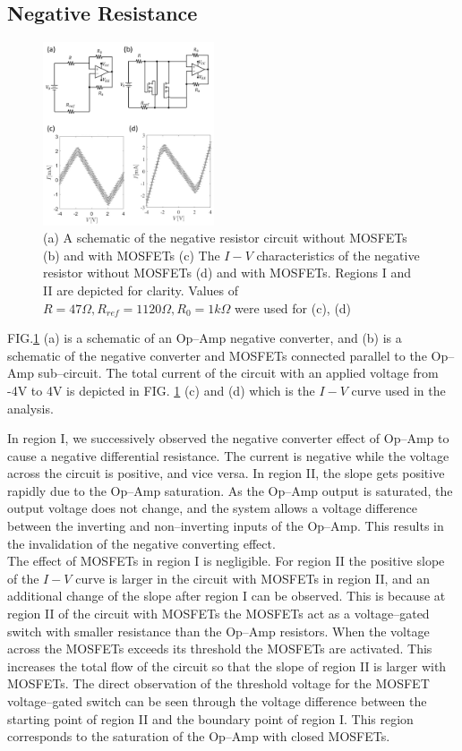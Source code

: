 \documentclass[%
 aip,
amsmath,amssymb,
reprint,
]{revtex4-1}
\begin{document}
\subsection{Negative Resistance}
\begin{figure}[!h]
  \centering
  \includegraphics[width=0.45\textwidth]{figures/Fig1.png}
  \caption{(a) A schematic of the negative resistor circuit without MOSFETs (b) and with MOSFETs (c) The $I-V$ characteristics of the negative resistor without MOSFETs (d) and with MOSFETs. Regions I and II are depicted for clarity. Values of $R = 47\Omega, R_{ref} = 1120\Omega, R_0 = 1k\Omega$ were used for (c), (d)}
  \label{fig:Fig1}
\end{figure}

FIG.\ref{fig:Fig1} (a) is a schematic of an Op--Amp negative converter, and (b) is a schematic of the negative converter and MOSFETs connected parallel to the Op--Amp sub--circuit. The total current of the circuit with an applied voltage from -4V to 4V is depicted in FIG. \ref{fig:Fig1} (c) and (d) which is the $I-V$ curve used in the analysis. 

In region I, we successively observed the negative converter effect of Op--Amp to cause a negative differential resistance. The current is negative while the voltage across the circuit is positive, and vice versa. In region II, the slope gets positive rapidly due to the Op--Amp saturation. As the Op--Amp output is saturated, the output voltage does not change, and the system allows a voltage difference between the inverting and non--inverting inputs of the Op--Amp. This results in the invalidation of the negative converting effect.\\

The effect of MOSFETs in region I is negligible. For region II the positive slope of the $I-V$ curve is larger in the circuit with MOSFETs in region II, and an additional change of the slope after region I can be observed. This is because at region II of the circuit with MOSFETs the MOSFETs act as a voltage--gated switch with smaller resistance than the Op--Amp resistors. When the voltage across the MOSFETs exceeds its threshold the MOSFETs are activated. This increases the total flow of the circuit so that the slope of region II is larger with MOSFETs. The direct observation of the threshold voltage for the MOSFET voltage--gated switch can be seen through the voltage difference between the starting point of region II and the boundary point of region I. This region corresponds to the saturation of the Op--Amp with closed MOSFETs.\\
\end{document}
